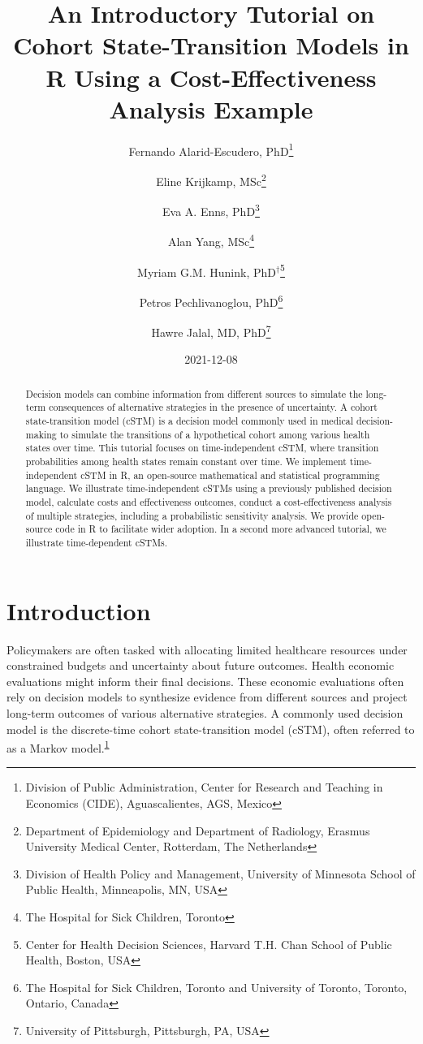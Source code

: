 \documentclass[
]{article}
\title{An Introductory Tutorial on Cohort State-Transition Models in R Using a Cost-Effectiveness Analysis Example}
\author{Fernando Alarid-Escudero, PhD\footnote{Division of Public Administration, Center for Research and Teaching in Economics (CIDE), Aguascalientes, AGS, Mexico} \and Eline Krijkamp, MSc\footnote{Department of Epidemiology and Department of Radiology, Erasmus University Medical Center, Rotterdam, The Netherlands} \and Eva A. Enns, PhD\footnote{Division of Health Policy and Management, University of Minnesota School of Public Health, Minneapolis, MN, USA} \and Alan Yang, MSc\footnote{The Hospital for Sick Children, Toronto} \and Myriam G.M. Hunink, PhD\(^\dagger\)\footnote{Center for Health Decision Sciences, Harvard T.H. Chan School of Public Health, Boston, USA} \and Petros Pechlivanoglou, PhD\footnote{The Hospital for Sick Children, Toronto and University of Toronto, Toronto, Ontario, Canada} \and Hawre Jalal, MD, PhD\footnote{University of Pittsburgh, Pittsburgh, PA, USA}}
\date{2021-12-08}
\begin{document}
\maketitle
\begin{abstract}
Decision models can combine information from different sources to simulate the long-term consequences of alternative strategies in the presence of uncertainty. A cohort state-transition model (cSTM) is a decision model commonly used in medical decision-making to simulate the transitions of a hypothetical cohort among various health states over time. This tutorial focuses on time-independent cSTM, where transition probabilities among health states remain constant over time. We implement time-independent cSTM in R, an open-source mathematical and statistical programming language. We illustrate time-independent cSTMs using a previously published decision model, calculate costs and effectiveness outcomes, conduct a cost-effectiveness analysis of multiple strategies, including a probabilistic sensitivity analysis. We provide open-source code in R to facilitate wider adoption. In a second more advanced tutorial, we illustrate time-dependent cSTMs.
\end{abstract}

{
\setcounter{tocdepth}{2}
\tableofcontents
}
\hypertarget{introduction}{%
\section{Introduction}\label{introduction}}

Policymakers are often tasked with allocating limited healthcare resources under constrained budgets and uncertainty about future outcomes. Health economic evaluations might inform their final decisions. These economic evaluations often rely on decision models to synthesize evidence from different sources and project long-term outcomes of various alternative strategies. A commonly used decision model is the discrete-time cohort state-transition model (cSTM), often referred to as a Markov model.\textsuperscript{\protect\hyperlink{ref-Kuntz2017}{1}}
\end{document}
